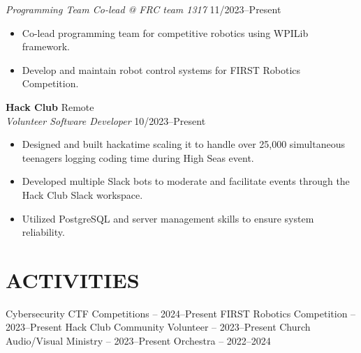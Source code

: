\documentclass[a4paper,10pt]{article}
\begin{document}
\textit{Programming Team Co-lead @ FRC team 1317} \hfill 11/2023--Present
\begin{itemize}[nosep,after=\strut, leftmargin=1em, itemsep=3pt,label=--]
\item Co-lead programming team for competitive robotics using WPILib framework.
\item Develop and maintain robot control systems for FIRST Robotics Competition.
\end{itemize}

\textbf{Hack Club} \hfill Remote\\
\textit{Volunteer Software Developer} \hfill 10/2023--Present
\begin{itemize}[nosep,after=\strut, leftmargin=1em, itemsep=3pt,label=--]
\item Designed and built hackatime scaling it to handle over 25,000 simultaneous teenagers logging coding time during High Seas event.
\item Developed multiple Slack bots to moderate and facilitate events through the Hack Club Slack workspace.
\item Utilized PostgreSQL and server management skills to ensure system reliability.
\end{itemize}

\section{ACTIVITIES}
\begin{center}
{\small Cybersecurity CTF Competitions -- 2024--Present \textbar{} FIRST Robotics Competition -- 2023--Present \textbar{} Hack Club Community Volunteer -- 2023--Present \textbar{} Church Audio/Visual Ministry -- 2023--Present \textbar{} Orchestra -- 2022--2024}
\end{center}

\vfill
{}
\end{document}
